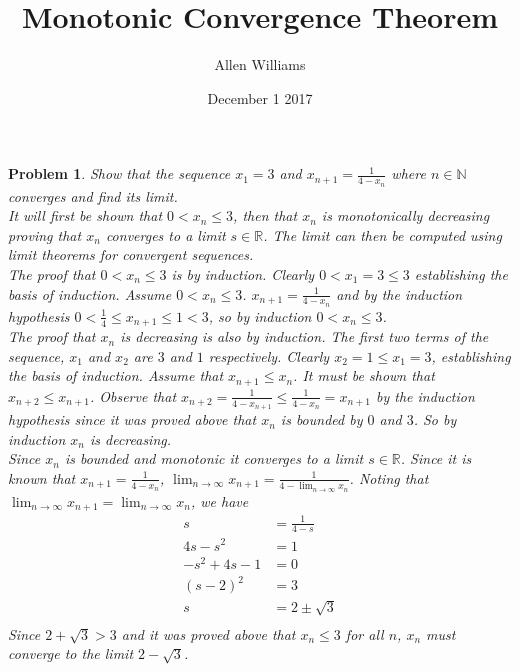 \documentclass{article}
\title{Monotonic Convergence Theorem}
\author{Allen Williams }
\date{December 1 2017}
\newtheorem*{Problem}{Problem}
\begin{document}
\maketitle
\begin{Problem}
Show that the sequence $x_1=3 $ and $x_{n+1}=\frac{1}{4-x_n}$ where $n\in\mathbb{N}$ converges and find its limit.\\
It will first be shown that $0<x_n\leq3$, then that $x_n$ is monotonically decreasing proving that $x_n$ converges to a limit $s\in\mathbb{R}$.  The limit can then be computed using limit theorems for convergent sequences.\\
The proof that $0<x_n\leq3$ is by induction.  Clearly $0<x_1=3\leq3$ establishing the basis of induction.  Assume $0<x_n\leq3$. $x_{n+1}=\frac{1}{4-x_n}$ and by the induction hypothesis $0<\frac{1}{4}\leq x_{n+1}\leq1<3$, so by induction $0<x_n\leq3$.\\
The proof that $x_n$ is decreasing is also by induction.  The first two terms of the sequence, $x_1$ and $x_2$ are $3$ and $1$ respectively.  Clearly $x_2=1\leq x_1=3$, establishing the basis of induction.  Assume that $x_{n+1}\leq x_n$.  It must be shown that $x_{n+2}\leq x_{n+1}$. Observe that $x_{n+2}=\frac{1}{4-x_{n+1}}\leq\frac{1}{4-x_n}=x_{n+1}$ by the induction hypothesis since it was proved above that $x_n$ is bounded by $0$ and $3$.  So by induction $x_n$ is decreasing.\\
Since $x_n$ is bounded and monotonic it converges to a limit $s\in\mathbb{R}$.  Since it is known that $x_{n+1}=\frac{1}{4-x_n}$, $\lim_{n\to\infty}x_{n+1}=\frac{1}{4-\lim_{n\to\infty}x_n}$.  Noting that $\lim_{n\to\infty}x_{n+1}=\lim_{n\to\infty}x_n$, we have 
\begin{align*}
   s&=\frac{1}{4-s} \\
   4s-s^2&=1 \\
   -s^2+4s-1&=0 \\
   (s-2)^2&=3 \\
   s&= 2\pm\sqrt{3} \\
\end{align*}
Since $2+\sqrt{3}>3$ and it was proved above that $x_n\leq 3$ for all $n$, $x_n$ must converge to the limit $2-\sqrt{3}$.
\end{Problem}
\end{document}

